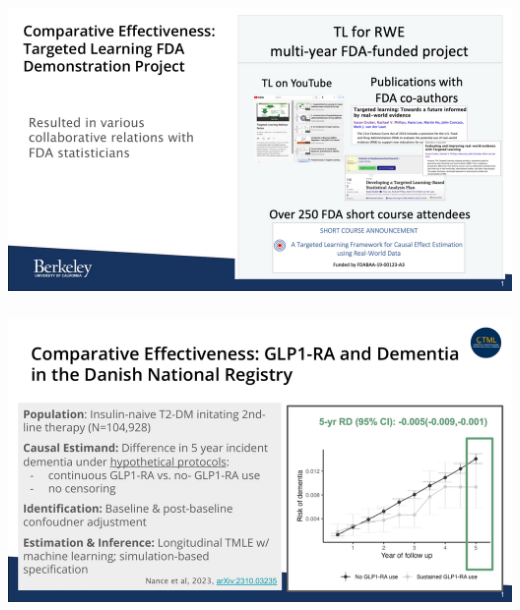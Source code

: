 \documentclass[t]{beamer}
\begin{document}
\begin{frame}
\frametitle{}
\vspace{20pt}
\begin{center}
\includegraphics[width=\textwidth]{figures/3-FDA-RWE-Subcommittee.pdf}
\end{center}
\vspace{35pt}
\end{frame}
\begin{frame}
\frametitle{}
\vspace{20pt}
\begin{center}
\includegraphics[width=\textwidth]{figures/4-FDA-RWE-Subcommittee.pdf}
\end{center}
\vspace{35pt}
\end{frame}
\end{document}
